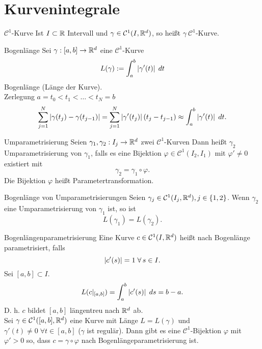 \documentclass[main.tex]{subfiles}
\begin{document}
\section*{Kurvenintegrale}

\begin{karte}{\( \mathcal{C}^1 \)-Kurve}
    Ist \( I \subset \R \) Intervall und
    \( \gamma \in \mathcal{C}^1(I, \R^d) \),
    so heißt \(\gamma \ \mathcal{C}^1\)-Kurve.
\end{karte}

\begin{karte}{Bogenlänge}
    Sei \(\abb{\gamma}{[a,b]}{\R^d}\) eine \(\mathcal{C}^1\)-Kurve
    \[ L(\gamma) := \integralx{\abs{\gamma'(t)}}{a}{b}{t} \]
    Bogenlänge (Länge der Kurve).\\
    Zerlegung \(a = t_0 < t_1 < \ldots < t_N = b\)
    \[ \sum_{j=1}^N \abs{\gamma(t_j) - \gamma(t_{j-1})} 
    = \sum_{j=1}^N \abs{\gamma'(t_j)} (t_j - t_{j-1}) 
    \approx \integralx{\abs{\gamma'(t)}}{a}{b}{t}. \]
\end{karte}

\begin{karte}{Umparametrisierung}
    Seien \(\abb{\gamma_1, \gamma_2}{I_j}{\R^d}\) zwei \(\mathcal{C}^1\)-Kurven
    Dann heißt \(\gamma_2\) Umparametrisierung von \( \gamma_1 \),
    falls es eine Bijektion \(\varphi \in \mathcal{C}^1(I_2, I_1)\)
    mit \(\varphi' \neq 0 \) existiert mit 
    \[ \gamma_2 = \gamma_1 \circ \varphi. \]
    Die Bijektion \( \varphi \) heißt Parametertransformation.
\end{karte}

\begin{karte}{Bogenlänge von Umparametrisierungen}
    Seien \(\gamma_j \in \mathcal{C}^1(I_j, \R^d), 
    j \in \set{1,2}\). Wenn \(\gamma_2\) eine Umparametrisierung  
    von \( \gamma_1 \) ist, so ist 
    \[ L(\gamma_1) = L(\gamma_2). \]
\end{karte}

\begin{karte}{Bogenlängenparametrisierung}
    Eine Kurve \(c \in \mathcal{C}^1(I, \R^d)\) heißt nach Bogenlänge
    parametrisiert, falls
    \[ \abs{c'(s)} = 1 \; \forall s \in I. \]
    Sei \( [a,b] \subset I \).
    \[ L(c \vert_{[a,b]}) = \integralx{\abs{c'(s)}}{a}{b}{s}
    = b - a. \]
    D. h. \(c\) bildet \([a,b]\) längentreu nach \(\R^d\) ab.\\
    Sei \( \gamma \in \mathcal{C}^1([a,b],\R^d) \) eine Kurve 
    mit Länge \(L = L(\gamma)\) und \(\gamma'(t) \neq 0 
    \; \forall t \in [a,b] \) (\( \gamma \) ist regulär).
    Dann gibt es eine \(\mathcal{C}^1\)-Bijektion \(\varphi\) 
    mit \( \varphi' > 0 \) so, dass \(c = \gamma \circ \varphi\) nach 
    Bogenlängeparametrisierung ist.
\end{karte}
\end{document}
